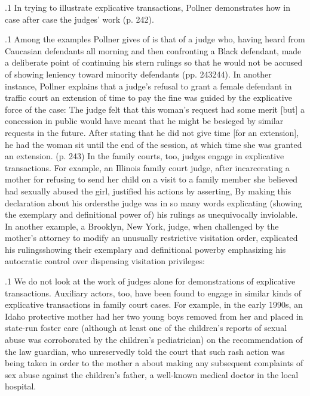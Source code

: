 \documentclass[11pt, twoside]{article}
\begin{document}
{\p.1{%
In trying to illustrate explicative transactions, Pollner demonstrates
how in case after case the judges’ work  (p. 242).
}%

\p.1{%
Among the examples Pollner gives of  is that
of a judge who, having heard from Caucasian defendants all morning
and then confronting a Black defendant, made a deliberate point of continuing his stern rulings so that he would not be accused of showing
leniency toward minority defendants (pp. 243\ndash{}244).
In another instance, Pollner explains that a judge’s refusal to grant a
female defendant in traffic court an extension of time to pay the fine was
guided by the explicative force of the case:
The judge felt that this woman’s request had some merit [but] a
concession in public would have meant that he might be besieged
by similar requests in the future. After stating that he did not give
time [for an extension], he had the woman sit until the end of the
session, at which time she was granted an extension. (p. 243)
In the family courts, too, judges engage in explicative transactions.
For example, an Illinois family court judge, after incarcerating a mother
for refusing to send her child on a visit to a family member she believed
had sexually abused the girl, justified his actions by asserting,  By making this declaration about his orders\mdash{}\mdash{}the judge was in so many words explicating (showing the exemplary and definitional power of) his rulings as
unequivocally inviolable.
In another example, a Brooklyn, New York, judge, when challenged
by the mother’s attorney to modify an unusually restrictive visitation order, explicated his rulings\mdash{}showing their exemplary and definitional
power\mdash{}by emphasizing his autocratic control over dispensing visitation privileges: 
}%

\p.1{%
We do not look at the work of judges alone for demonstrations of
explicative transactions. Auxiliary actors, too, have been found to engage in similar kinds of explicative transactions in family court cases.
For example, in the early 1990s, an Idaho protective mother had her
two young boys removed from her and placed in state-run foster
care (although at least one of the children’s reports of sexual abuse was
corroborated by the children’s pediatrician) on the recommendation of
the law guardian, who unreservedly told the court that such rash
action was being taken in order to  the mother a  about making
any subsequent complaints of sex abuse against the children’s father, a
well-known medical doctor in the local hospital.
}%


}
\end{document}
